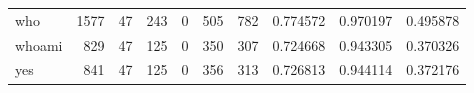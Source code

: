 \begin{longtable}{lrrrrrrrrr}
who       &                                1577 &                                              47 &                                            243 &                                             0 &                                            505 &                                          782 &                                           0.774572 &                               0.970197 &                             0.495878 \\
whoami    &                                 829 &                                              47 &                                            125 &                                             0 &                                            350 &                                          307 &                                           0.724668 &                               0.943305 &                             0.370326 \\
yes       &                                 841 &                                              47 &                                            125 &                                             0 &                                            356 &                                          313 &                                           0.726813 &                               0.944114 &                             0.372176 \\
\end{longtable}
